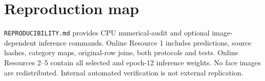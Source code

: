 \documentclass[10pt]{article}
\begin{document}
\section*{Reproduction map}
\texttt{REPRODUCIBILITY.md} provides CPU numerical-audit and optional image-dependent inference commands. Online Resource 1 includes predictions, source hashes, category maps, original-row joins, both protocols and tests. Online Resources 2--5 contain all selected and epoch-12 inference weights. No face images are redistributed. Internal automated verification is not external replication.
\end{document}
